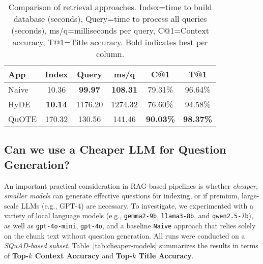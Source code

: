 \begin{table}[t]
\centering
\caption{Comparison of retrieval approaches. Index=time to build database (seconds), Query=time to process all queries (seconds), ms/q=milliseconds per query, C@1=Context accuracy, T@1=Title accuracy. Bold indicates best per column.}
\label{tab:dedup-quote}
\renewcommand{\arraystretch}{1.05}
\begin{tabular}{lccccc}
\toprule
\textbf{App} & \textbf{Index} & \textbf{Query} & \textbf{ms/q} & \textbf{C@1} & \textbf{T@1} \\
\midrule
Naive & 10.36 & \textbf{99.97} & \textbf{108.31} & 79.31\% & 96.64\% \\
HyDE & \textbf{10.14} & 1176.20 & 1274.32 & 76.60\% & 94.58\% \\
QuOTE & 170.32 & 130.56 & 141.46 & \textbf{90.03\%} & \textbf{98.37\%} \\
\bottomrule
\end{tabular}
\end{table}






\subsection{Can we use a Cheaper LLM for Question Generation?}
\label{subsec:cheaper-models}
An important practical consideration in RAG-based pipelines is whether \emph{cheaper, smaller models} can generate 
effective questions for indexing, or if premium, large-scale LLMs (e.g., GPT-4) are necessary. To investigate, 
we experimented with a variety of local language models (e.g., \texttt{gemma2-9b}, \texttt{llama3-8b}, and \texttt{qwen2.5-7b}), 
as well as \texttt{gpt-4o-mini}, \texttt{gpt-4o}, and a baseline \texttt{Naive} approach that relies solely on 
the chunk text without question generation. All runs were conducted on a \emph{SQuAD-based subset}. Table~\ref{tab:cheaper-models} 
summarizes the results in terms of 
\textbf{Top-$k$ Context Accuracy} and \textbf{Top-$k$ Title Accuracy}.


